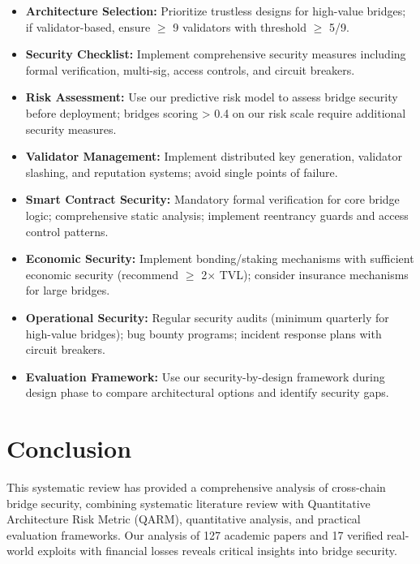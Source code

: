\documentclass[runningheads]{llncs}
\begin{document}
\begin{itemize}
    \item \textbf{Architecture Selection:} Prioritize trustless designs for high-value bridges; if validator-based, ensure $\geq$ 9 validators with threshold $\geq$ 5/9.
    
    \item \textbf{Security Checklist:} Implement comprehensive security measures including formal verification, multi-sig, access controls, and circuit breakers.
    
    \item \textbf{Risk Assessment:} Use our predictive risk model to assess bridge security before deployment; bridges scoring > 0.4 on our risk scale require additional security measures.
    
    \item \textbf{Validator Management:} Implement distributed key generation, validator slashing, and reputation systems; avoid single points of failure.
    
    \item \textbf{Smart Contract Security:} Mandatory formal verification for core bridge logic; comprehensive static analysis; implement reentrancy guards and access control patterns.
    
    \item \textbf{Economic Security:} Implement bonding/staking mechanisms with sufficient economic security (recommend $\geq$ 2$\times$ TVL); consider insurance mechanisms for large bridges.
    
    \item \textbf{Operational Security:} Regular security audits (minimum quarterly for high-value bridges); bug bounty programs; incident response plans with circuit breakers.
    
    \item \textbf{Evaluation Framework:} Use our security-by-design framework during design phase to compare architectural options and identify security gaps.
\end{itemize}

\vspace{-0.3cm}
\section{Conclusion}
\label{sec:conclusion}

This systematic review has provided a comprehensive analysis of cross-chain bridge security, combining systematic literature review with Quantitative Architecture Risk Metric (QARM), quantitative analysis, and practical evaluation frameworks. Our analysis of 127 academic papers and 17 verified real-world exploits with financial losses reveals critical insights into bridge security.
\end{document}
